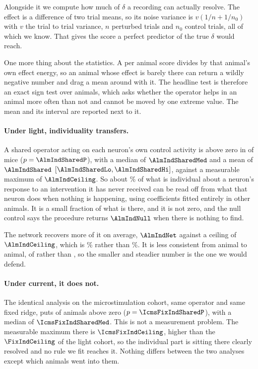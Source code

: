 \documentclass[11pt,letterpaper]{article}
\begin{document}
Alongside it we compute how much of $\delta$ a recording can actually resolve. The
effect is a difference of two trial means, so its noise variance is $v(1/n + 1/n_0)$
with $v$ the trial to trial variance, $n$ perturbed trials and $n_0$ control trials,
all of which we know. That gives the score a perfect predictor of the true $\delta$
would reach.

One more thing about the statistics. A per animal score divides by that animal's own
effect energy, so an animal whose effect is barely there can return a wildly negative
number and drag a mean around with it. The headline test is therefore an exact sign
test over animals, which asks whether the operator helps in an animal more often than
not and cannot be moved by one extreme value. The mean and its interval are reported
next to it.

\paragraph{Under light, individuality transfers.}
A shared operator acting on each neuron's own control activity is above zero in
\AlmIndSharedPos{} of \AlmIndSharedN{} mice ($p = \AlmIndSharedP$), with a median of
$\AlmIndSharedMed$ and a mean of $\AlmIndShared$
$[\AlmIndSharedLo, \AlmIndSharedHi]$, against a measurable maximum of
$\AlmIndCeiling$. So about \AlmIndFrac\% of what is individual about a neuron's response
to an intervention it has never received can be read off from what that neuron does when
nothing is happening, using coefficients fitted entirely in other animals. It is a small
fraction of what is there, and it is not zero, and the null control says the procedure
returns $\AlmIndNull$ when there is nothing to find.

The network recovers more of it on average, $\AlmIndNet$ against a ceiling of
$\AlmIndCeiling$, which is \AlmIndNetFrac\% rather than \AlmIndFrac\%. It is less
consistent from animal to animal, \AlmIndNetPos{} of \AlmIndNetN{} rather than
\AlmIndSharedPos, so the smaller and steadier number is the one we would defend.

\paragraph{Under current, it does not.}
The identical analysis on the microstimulation cohort, same operator and same fixed
ridge, puts \IcmsFixIndSharedPos{} of \IcmsFixIndSharedN{} animals above zero
($p = \IcmsFixIndSharedP$), with a median of $\IcmsFixIndSharedMed$. This is not a
measurement problem. The measurable maximum there is $\IcmsFixIndCeiling$, higher than
the $\FixIndCeiling$ of the light cohort, so the individual part is sitting there
clearly resolved and no rule we fit reaches it. Nothing differs between the two
analyses except which animals went into them.
\end{document}
